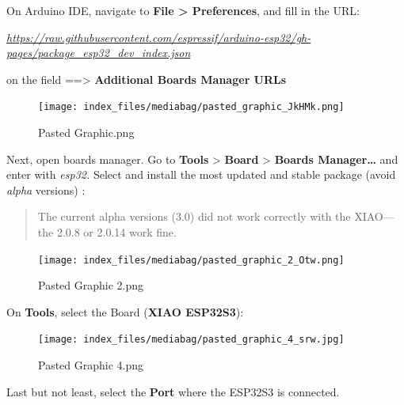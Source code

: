 \documentclass[
  letterpaper,
  DIV=11,
  numbers=noendperiod]{scrreprt}
\begin{document}

On Arduino IDE, navigate to \textbf{File \textgreater{} Preferences},
and fill in the URL:

\href{https://raw.githubusercontent.com/espressif/arduino-esp32/gh-pages/package_esp32_dev_index.json}{\emph{https://raw.githubusercontent.com/espressif/arduino-esp32/gh-pages/package\_esp32\_dev\_index.json}}

on the field ==\textgreater{} \textbf{Additional Boards Manager URLs}

\begin{figure}[H]

{\centering \texttt{[image: index\_files/mediabag/pasted\_graphic\_JkHMk.png]}

}

\caption{Pasted Graphic.png}

\end{figure}

Next, open boards manager. Go to \textbf{Tools} \textgreater{}
\textbf{Board} \textgreater{} \textbf{Boards Manager\ldots{}} and enter
with \emph{esp32.} Select and install the most updated and stable
package (avoid \emph{alpha} versions) :

\begin{quote}
The current alpha versions (3.0) did not work correctly with the
XIAO---the 2.0.8 or 2.0.14 work fine.
\end{quote}

\begin{figure}[H]

{\centering \texttt{[image: index\_files/mediabag/pasted\_graphic\_2\_Otw.png]}

}

\caption{Pasted Graphic 2.png}

\end{figure}

On \textbf{Tools}, select the Board (\textbf{XIAO ESP32S3}):

\begin{figure}[H]

{\centering \texttt{[image: index\_files/mediabag/pasted\_graphic\_4\_srw.jpg]}

}

\caption{Pasted Graphic 4.png}

\end{figure}

Last but not least, select the \textbf{Port} where the ESP32S3 is
connected.
\end{document}
